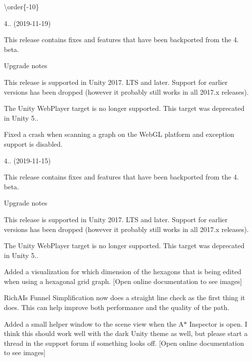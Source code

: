 \textbackslash{}order\{-\/10\}


\begin{DoxyItemize}
\item 4.. (2019-\/11-\/19)
\begin{DoxyItemize}
\item This release contains fixes and features that have been backported from the 4. beta.
\item Upgrade notes
\begin{DoxyItemize}
\item This release is supported in Unity 2017. L\+TS and later. Support for earlier versions has been dropped (however it probably still works in all 2017.\+x releases).
\item The Unity Web\+Player target is no longer supported. This target was deprecated in Unity 5..
\end{DoxyItemize}
\item Fixed a crash when scanning a graph on the Web\+GL platform and exception support is disabled.
\end{DoxyItemize}
\item 4.. (2019-\/11-\/15)
\begin{DoxyItemize}
\item This release contains fixes and features that have been backported from the 4. beta.
\item Upgrade notes
\begin{DoxyItemize}
\item This release is supported in Unity 2017. L\+TS and later. Support for earlier versions has been dropped (however it probably still works in all 2017.\+x releases).
\item The Unity Web\+Player target is no longer supported. This target was deprecated in Unity 5..
\end{DoxyItemize}
\item Added a visualization for which dimension of the hexagons that is being edited when using a hexagonal grid graph. \mbox{[}Open online documentation to see images\mbox{]}
\item Rich\+AI\textquotesingle{}s Funnel Simplification now does a straight line check as the first thing it does. This can help improve both performance and the quality of the path.
\item Added a small helper window to the scene view when the A$\ast$ Inspector is open. I think this should work well with the dark Unity theme as well, but please start a thread in the support forum if something looks off. \mbox{[}Open online documentation to see images\mbox{]}

\end{DoxyItemize}
\end{DoxyItemize}
